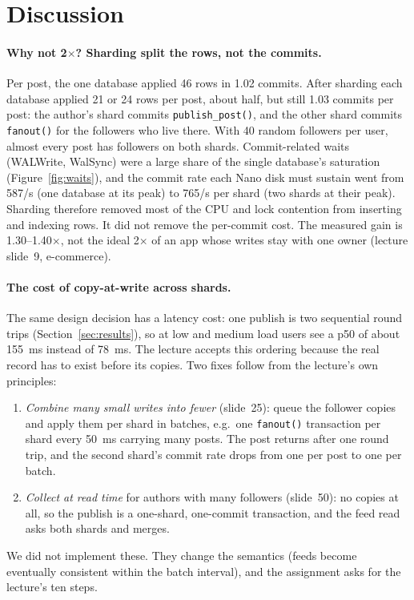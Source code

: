 \section{Discussion}\label{sec:discussion}

\paragraph{Why not 2$\times$? Sharding split the rows, not the commits.}
Per post, the one database applied 46 rows in 1.02 commits. After sharding each database applied 21 or 24 rows
per post, about half, but still 1.03 commits per post: the author's shard commits \texttt{publish\_post()},
and the other shard commits \texttt{fanout()} for the followers who live there. With 40 random followers per
user, almost every post has followers on both shards. Commit-related waits (WALWrite, WalSync) were a large share
of the single database's saturation (Figure~\ref{fig:waits}), and the commit rate each Nano disk must sustain went from
587/s (one database at its peak) to 765/s per shard (two shards at their peak). Sharding therefore removed most of the
CPU and lock contention from inserting and indexing rows. It did not remove the per-commit cost. The
measured gain is 1.30--1.40$\times$, not the ideal 2$\times$ of an app whose writes stay with one owner (lecture
slide~9, e-commerce).

\paragraph{The cost of copy-at-write across shards.} The same design decision has a latency cost: one publish is
two sequential round trips (Section~\ref{sec:results}), so at low and medium load users see a p50 of about 155~ms instead of 78~ms.
The lecture accepts this ordering because the real record has to exist before its copies. Two fixes follow from the
lecture's own principles:
\begin{enumerate}[nosep,leftmargin=1.4em]
\item \emph{Combine many small writes into fewer} (slide~25): queue the follower copies and apply them per shard
      in batches, e.g.\ one \texttt{fanout()} transaction per shard every 50~ms carrying many posts. The post returns
      after one round trip, and the second shard's commit rate drops from one per post to one per batch.
\item \emph{Collect at read time} for authors with many followers (slide~50): no copies at all, so the publish is a
      one-shard, one-commit transaction, and the feed read asks both shards and merges.
\end{enumerate}
We did not implement these. They change the semantics (feeds become eventually consistent within the batch interval),
and the assignment asks for the lecture's ten steps.

